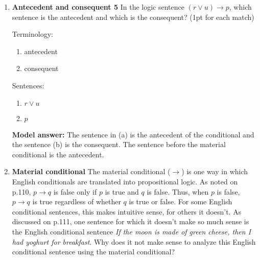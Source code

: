\documentclass[a4,11pt]{article}
\newcommand{\6}{\mbox{$[\hspace*{-.6mm}[$}}
\newcommand{\9}{\mbox{$]\hspace*{-.6mm}]$}}
\begin{document}
\begin{enumerate}[leftmargin = 12pt]
Terminology:

\begin{enumerate}
\item antecedent
\item consequent
\end{enumerate}

Sentences:

\begin{enumerate}
\item $\neg q$
\item $p \wedge r$
\end{enumerate}

{ \bf Model answer:}  The sentence in (a) is the antecedent of the conditional and the sentence (b) is the consequent. The sentence before the material conditional  is the antecedent.

\item {\bf  Antecedent and consequent 5} In the logic sentence $(r \vee u) \rightarrow p$, which sentence is the antecedent and which is the consequent? (1pt for each match)

Terminology:

\begin{enumerate}
\item antecedent
\item consequent
\end{enumerate}

Sentences:

\begin{enumerate}
\item $r \vee u$
\item $p$
\end{enumerate}

{ \bf Model answer:}  The sentence in (a) is the antecedent of the conditional and the sentence (b) is the consequent. The sentence before the material conditional  is the antecedent.

\item {\bf  Material conditional} The material conditional ($\rightarrow$) is one way in which English conditionals are translated into propositional logic. As noted on p.110, $p \rightarrow q$ is false only if $p$ is true and $q$ is false. Thus, when $p$ is false, $p \rightarrow q$ is true regardless of whether $q$ is true or false. For some English conditional sentences, this makes intuitive sense, for others it doesn't. As discussed on p.111, one sentence for which it doesn't make so much sense is the English conditional sentence {\em If the moon is made of green cheese, then I had yoghurt for breakfast}. Why does it not make sense to analyze this English conditional sentence using the material conditional? 


\end{enumerate}
\end{document}

